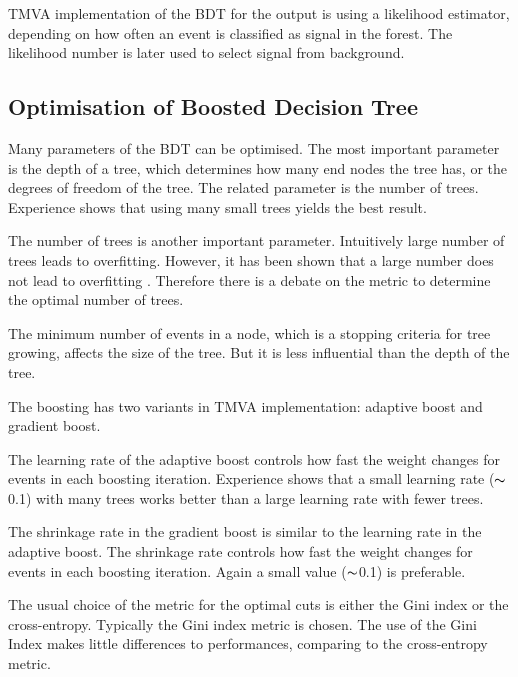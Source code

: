 
TMVA implementation of the BDT for the output is using a likelihood estimator, depending on how often an event is classified as signal in the forest. The likelihood number is later used to select signal from background.

\subsection{Optimisation of Boosted Decision Tree}
\label{sec:pandoraMVAbdtVar}

Many parameters of the BDT can be optimised. The most important parameter is the depth of a tree, which determines how many end nodes the tree has, or the degrees of freedom of the tree. The related parameter is the number of trees. Experience shows that using many small trees yields the best result.

The number of trees is another important parameter. Intuitively large number of trees leads to overfitting. However, it has been shown that a large number does not lead to overfitting \cite{hastie2009elements}. Therefore there is a debate on the metric to determine the optimal number of trees.

The minimum number of events in a node, which is a stopping criteria for tree growing, affects the size of the tree. But it is less influential than the depth of the tree.

The boosting has two variants in TMVA implementation: adaptive boost and gradient boost.

The learning rate of the adaptive boost  controls how fast the weight changes for events in each boosting iteration. Experience shows that a small learning rate ($\thicksim$0.1) with many trees works better than a large learning rate with fewer trees.

The shrinkage rate in the gradient boost is similar to the learning rate in the adaptive boost. The shrinkage rate controls how fast the weight changes for events in each boosting iteration. Again a small value   ($\thicksim$0.1) is preferable.

The usual choice of the metric for the optimal cuts is either the Gini index or the cross-entropy. Typically the Gini index metric is chosen. The use of the Gini Index  makes little differences to performances, comparing to the cross-entropy metric.

